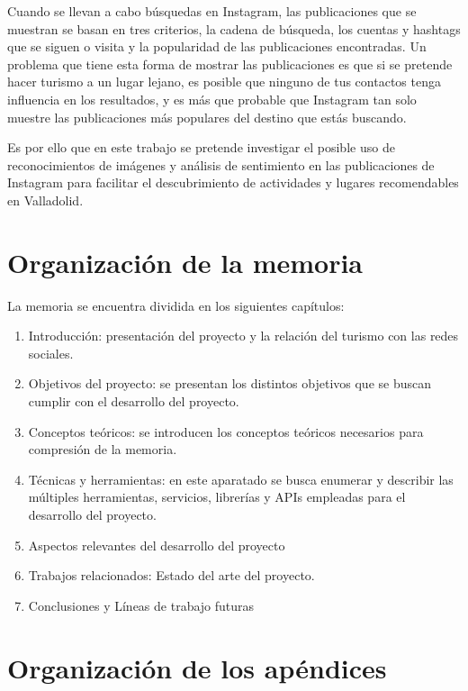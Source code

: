 Cuando se llevan a cabo búsquedas en Instagram, las publicaciones que se muestran se basan en tres criterios, la cadena de búsqueda, los cuentas y hashtags que se siguen o visita y la popularidad de las publicaciones encontradas. Un problema que tiene esta forma de mostrar las publicaciones es que si se pretende hacer turismo a un lugar lejano, es posible que ninguno de tus contactos tenga influencia en los resultados, y es más que probable que Instagram tan solo muestre las publicaciones más populares del destino que estás buscando.

Es por ello que en este trabajo se pretende investigar el posible uso de reconocimientos de imágenes y análisis de sentimiento en las publicaciones de Instagram para facilitar el descubrimiento de actividades y lugares recomendables en Valladolid.

\section{Organización de la memoria}
La memoria se encuentra dividida en los siguientes capítulos:

\begin{enumerate}
    \item Introducción: presentación del proyecto y la relación del turismo con las redes sociales.
    \item Objetivos del proyecto: se presentan los distintos objetivos que se buscan cumplir con el desarrollo del proyecto.
    \item Conceptos teóricos: se introducen los conceptos teóricos necesarios para compresión de la memoria.
    \item Técnicas y herramientas: en este aparatado se busca enumerar y describir las múltiples herramientas, servicios, librerías y APIs empleadas para el desarrollo del proyecto.
    \item Aspectos relevantes del desarrollo del proyecto
    \item Trabajos relacionados: Estado del arte del proyecto.
    \item Conclusiones y Líneas de trabajo futuras
\end{enumerate}

\section{Organización de los apéndices}
